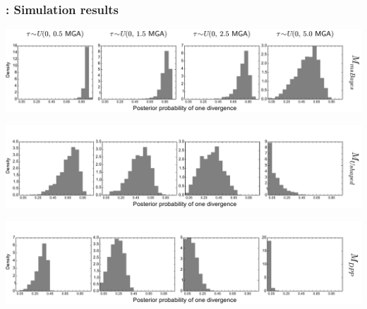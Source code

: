 
\begin{frame}
    \frametitle{\dppmsbayes: Simulation results}
        \centerline{
        \includegraphics[width=\textwidth]{../images/old_old_power_psi_prob.pdf}}
        \vspace{0mm}
        \centerline{
        \includegraphics[width=\textwidth]{../images/old_u-shaped_power_psi_prob_headless.pdf}}
        \vspace{0mm}
        \centerline{
        \includegraphics[width=\textwidth]{../images/old_dpp_power_psi_prob_headless.pdf}}
\end{frame}

